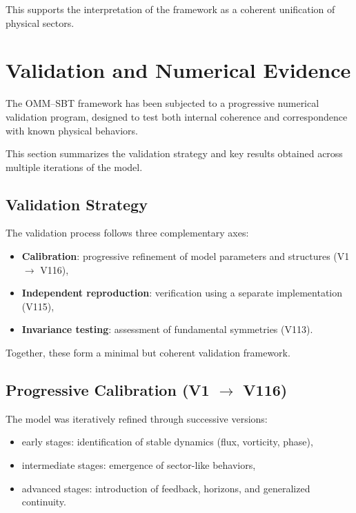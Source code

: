 \documentclass[11pt]{article}
\begin{document}
This supports the interpretation of the framework as a coherent unification of physical sectors.

\section{Validation and Numerical Evidence}

The OMM--SBT framework has been subjected to a progressive numerical validation program, designed to test both internal coherence and correspondence with known physical behaviors.

This section summarizes the validation strategy and key results obtained across multiple iterations of the model.

\subsection{Validation Strategy}

The validation process follows three complementary axes:

\begin{itemize}
\item \textbf{Calibration}: progressive refinement of model parameters and structures (V1 $\rightarrow$ V116),
\item \textbf{Independent reproduction}: verification using a separate implementation (V115),
\item \textbf{Invariance testing}: assessment of fundamental symmetries (V113).
\end{itemize}

Together, these form a minimal but coherent validation framework.

\subsection{Progressive Calibration (V1 $\rightarrow$ V116)}

The model was iteratively refined through successive versions:

\begin{itemize}
\item early stages: identification of stable dynamics (flux, vorticity, phase),
\item intermediate stages: emergence of sector-like behaviors,
\item advanced stages: introduction of feedback, horizons, and generalized continuity.
\end{itemize}
\end{document}
